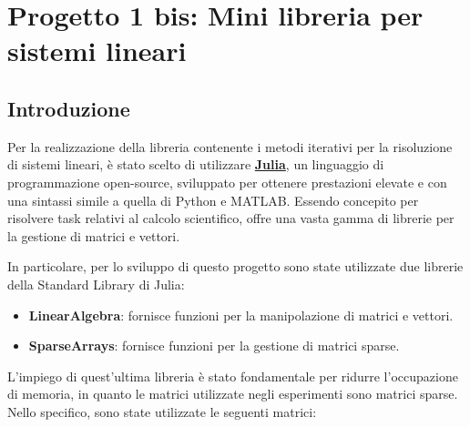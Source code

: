 \chapter{Progetto 1 bis: Mini libreria per sistemi lineari}
\section{Introduzione}
Per la realizzazione della libreria contenente i metodi iterativi per la risoluzione
di sistemi lineari, è stato scelto di utilizzare \href{https://julialang.org/}{\textbf{Julia}},
un linguaggio di programmazione open-source, sviluppato per ottenere prestazioni
elevate e con una sintassi simile a quella di Python e MATLAB. Essendo concepito
per risolvere task relativi al calcolo scientifico, offre una vasta gamma di
librerie per la gestione di matrici e vettori.

In particolare, per lo sviluppo di questo progetto sono state utilizzate due
librerie della Standard Library di Julia:
\begin{itemize}
    \item \textbf{LinearAlgebra}: fornisce funzioni per la manipolazione di
          matrici e vettori.
    \item \textbf{SparseArrays}: fornisce funzioni per la gestione di matrici sparse.
\end{itemize}

L'impiego di quest'ultima libreria è stato fondamentale per ridurre l'occupazione
di memoria, in quanto le matrici utilizzate negli esperimenti sono matrici sparse.
Nello specifico, sono state utilizzate le seguenti matrici:
\begin{table}[!ht]
    \centering
    \caption{Caratteristiche delle matrici utilizzate. Con dominanza diagonale
        si intende quella stretta e per righe.}
\end{table}

